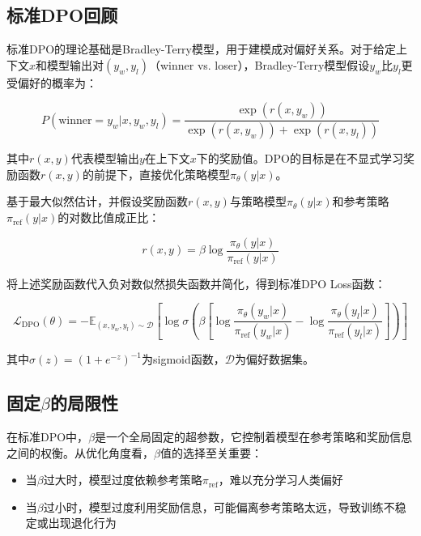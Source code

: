 \subsection{标准DPO回顾}
标准DPO的理论基础是Bradley-Terry模型，用于建模成对偏好关系。对于给定上下文$x$和模型输出对$(y_w, y_l)$（winner vs. loser），Bradley-Terry模型假设$y_w$比$y_l$更受偏好的概率为：

\begin{equation}
P(\text{winner} = y_w | x, y_w, y_l) = \frac{\exp(r(x, y_w))}{\exp(r(x, y_w)) + \exp(r(x, y_l))}
\end{equation}

其中$r(x, y)$代表模型输出$y$在上下文$x$下的奖励值。DPO的目标是在不显式学习奖励函数$r(x, y)$的前提下，直接优化策略模型$\pi_\theta(y|x)$。

基于最大似然估计，并假设奖励函数$r(x, y)$与策略模型$\pi_\theta(y|x)$和参考策略$\pi_{\text{ref}}(y|x)$的对数比值成正比：

\begin{equation}
r(x, y) = \beta \log \frac{\pi_\theta(y|x)}{\pi_{\text{ref}}(y|x)}
\end{equation}

将上述奖励函数代入负对数似然损失函数并简化，得到标准DPO Loss函数：

\begin{equation}
\mathcal{L}_{\text{DPO}}(\theta) = - \mathbb{E}_{(x, y_w, y_l) \sim \mathcal{D}} \left[ \log \sigma \left( \beta \left[ \log \frac{\pi_\theta(y_w|x)}{\pi_{\text{ref}}(y_w|x)} - \log \frac{\pi_\theta(y_l|x)}{\pi_{\text{ref}}(y_l|x)} \right] \right) \right]
\end{equation}

其中$\sigma(z) = (1 + e^{-z})^{-1}$为sigmoid函数，$\mathcal{D}$为偏好数据集。

\subsection{固定$\beta$的局限性}
在标准DPO中，$\beta$是一个全局固定的超参数，它控制着模型在参考策略和奖励信息之间的权衡。从优化角度看，$\beta$值的选择至关重要：

\begin{itemize}
    \item 当$\beta$过大时，模型过度依赖参考策略$\pi_{\text{ref}}$，难以充分学习人类偏好
    \item 当$\beta$过小时，模型过度利用奖励信息，可能偏离参考策略太远，导致训练不稳定或出现退化行为
\end{itemize}

